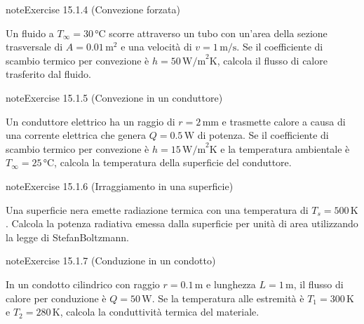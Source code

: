 \documentclass[letterpaper,10pt,italian]{jupyterBook}
\begin{document}
\begin{sphinxadmonition}{note}{Exercise 15.1.4 (Convezione forzata)}



\sphinxAtStartPar
Un fluido a \(T_\infty = 30 \, \text{°C}\) scorre attraverso un tubo con un’area della sezione trasversale di \(A = 0.01 \, \text{m}^2\) e una velocità di \(v = 1 \, \text{m/s}\). Se il coefficiente di scambio termico per convezione è \(h = 50 \, \text{W/m}^2\text{K}\), calcola il flusso di calore trasferito dal fluido.
\end{sphinxadmonition}
 \label{exercise:ch/thermodynamics/heat-transmission-problems-exercise-4}

\begin{sphinxadmonition}{note}{Exercise 15.1.5 (Convezione in un conduttore)}



\sphinxAtStartPar
Un conduttore elettrico ha un raggio di \(r = 2 \, \text{mm}\) e trasmette calore a causa di una corrente elettrica che genera \(Q = 0.5 \, \text{W}\) di potenza. Se il coefficiente di scambio termico per convezione è \(h = 15 \, \text{W/m}^2\text{K}\) e la temperatura ambientale è \(T_\infty = 25 \, \text{°C}\), calcola la temperatura della superficie del conduttore.
\end{sphinxadmonition}
 \label{exercise:ch/thermodynamics/heat-transmission-problems-exercise-5}

\begin{sphinxadmonition}{note}{Exercise 15.1.6 (Irraggiamento in una superficie)}



\sphinxAtStartPar
Una superficie nera emette radiazione termica con una temperatura di \(T_s = 500 \, \text{K}\). Calcola la potenza radiativa emessa dalla superficie per unità di area utilizzando la legge di Stefan\sphinxhyphen{}Boltzmann.
\end{sphinxadmonition}
 \label{exercise:ch/thermodynamics/heat-transmission-problems-exercise-6}

\begin{sphinxadmonition}{note}{Exercise 15.1.7 (Conduzione in un condotto)}



\sphinxAtStartPar
In un condotto cilindrico con raggio \(r = 0.1 \, \text{m}\) e lunghezza \(L = 1 \, \text{m}\), il flusso di calore per conduzione è \(Q = 50 \, \text{W}\). Se la temperatura alle estremità è \(T_1 = 300 \, \text{K}\) e \(T_2 = 280 \, \text{K}\), calcola la conduttività termica del materiale.
\end{sphinxadmonition}
 \label{exercise:ch/thermodynamics/heat-transmission-problems-exercise-7}
\end{document}
